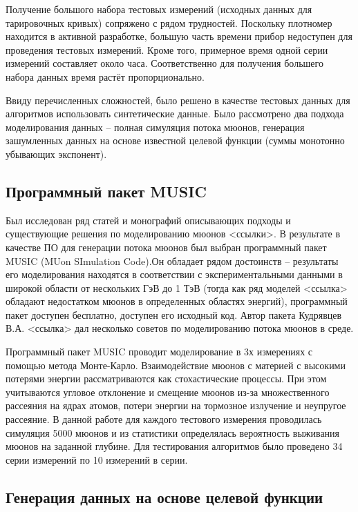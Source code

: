Получение большого набора тестовых измерений (исходных данных 
для тарировочных кривых) сопряжено с рядом трудностей. Поскольку 
плотномер находится в активной разработке,
большую часть времени прибор недоступен для проведения тестовых
измерений. Кроме того, примерное время одной серии измерений составляет
около часа. Соответственно 
для получения большего набора данных время растёт пропорционально.


Ввиду перечисленных сложностей, было решено в качестве тестовых
данных для алгоритмов использовать синтетические данные. Было 
рассмотрено два подхода моделирования данных -- 
полная симуляция потока мюонов, генерация зашумленных данных 
на основе известной целевой функции (суммы монотонно убывающих экспонент).


\subsection{Программный пакет MUSIC}\label{subsect2_3_1}


Был исследован ряд статей и монографий описывающих подходы и существующие
решения по моделированию мюонов <ссылки>. В результате в качестве ПО для 
генерации потока мюонов
был выбран программный пакет MUSIC (MUon SImulation Code).Он обладает
рядом достоинств -- 
результаты его моделирования находятся в соответствии с экспериментальными
данными в широкой области от нескольких ГэВ до 1 ТэВ (тогда как ряд
моделей <ссылка> обладают
недостатком мюонов в определенных областях энергий), программный 
пакет доступен бесплатно, доступен его исходный код. Автор пакета
Кудрявцев В.А. <ссылка> дал несколько 
советов по моделированию потока мюонов в среде.


Программный пакет MUSIC проводит моделирование в 3х измерениях с помощью 
метода Монте-Карло. Взаимодействие мюонов с материей с высокими
потерями энергии рассматриваются 
как стохастические процессы. При этом учитываются угловое отклонение 
и смещение мюонов из-за множественного рассеяния на ядрах атомов, 
потери энергии на тормозное излучение
и неупругое рассеяние. В данной работе для каждого тестового измерения 
проводилась симуляция 5000 мюонов и из статистики определялась вероятность
выживания мюонов на заданной глубине. 
Для тестирования алгоритмов было проведено 34 серии измерений по 10 измерений в серии. 


\subsection{Генерация данных на основе целевой функции}\label{subsect2_3_2}


